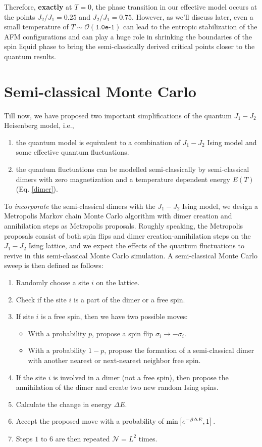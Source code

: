 \documentclass[../thesis_main.tex]{subfiles}
\begin{document}
Therefore, \textbf{exactly} at $T=0$, the phase transition in our effective model occurs at the points $J_2/J_1 = 0.25$ and $J_2/J_1 = 0.75$. However, as we'll discuss later, even a small temperature of $T\sim \mathcal{O}(\texttt{1.0e-1})$ can lead to the entropic stabilization of the AFM configurations and can play a huge role in shrinking the boundaries of the spin liquid phase to bring the semi-classically derived critical points closer to the quantum results.

\section{Semi-classical Monte Carlo} \label{SCMC}
Till now, we have proposed two important simplifications of the quantum $J_1-J_2$ Heisenberg model, i.e., 
\begin{enumerate}
    \item the quantum model is equivalent to a combination of $J_1-J_2$ Ising model and some effective quantum fluctuations.
    \item the quantum fluctuations can be modelled semi-classically by semi-classical dimers with zero magnetization and a temperature dependent energy $E(T)$ (Eq. \eqref{dimer}).
\end{enumerate}
To \textit{incorporate} the semi-classical dimers with the $J_1-J_2$ Ising model, we design a Metropolis Markov chain Monte Carlo algorithm with dimer creation and annihilation steps as Metropolis proposals. Roughly speaking, the Metropolis proposals consist of both spin flips and dimer creation-annihilation steps on the $J_1-J_2$ Ising lattice, and we expect the effects of the quantum fluctuations to revive in this semi-classical Monte Carlo simulation. A semi-classical Monte Carlo sweep is then defined as follows:
\begin{enumerate}
    \setlength\itemsep{0.1em}
    \item Randomly choose a site $i$ on the lattice.
    \item Check if the site $i$ is a part of the dimer or a free spin. 
    
    \item If site $i$ is a free spin, then we have two possible moves:
    \begin{itemize}[label={\textbf{--}}]
        \setlength{\itemsep}{0.1em}
        \item With a probability $p$, propose a spin flip $\sigma_i \to -\sigma_i$.
        \item With a probability $1-p$, propose the formation of a semi-classical dimer with another nearest or next-nearest neighbor free spin.
    \end{itemize}
    \item If the site $i$ is involved in a dimer (not a free spin), then propose the annihilation of the dimer and create two new random Ising spins. 
    \item Calculate the change in energy $\Delta E$. 
    \item Accept the proposed move with a probability of $\min \qty[e^{-\beta \Delta E}, 1]$.
    \item Steps $1$ to $6$ are then repeated $\mathcal{N} = L^2$ times.
\end{enumerate}
\end{document}
